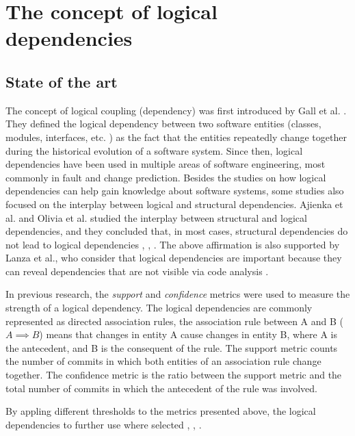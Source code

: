 \documentclass[runningheads]{comsis2}
\begin{document}
\section{The concept of logical dependencies}

\subsection{State of the art}

The concept of logical coupling (dependency) was first introduced by Gall et al. \cite{Gall:1998:DLC:850947.853338}. They defined the logical dependency between two software entities (classes, modules, interfaces, etc. ) as the fact that the entities repeatedly change together during the historical evolution of a software system.
Since then, logical dependencies have been used in multiple areas of software engineering, most commonly in fault and change prediction.  
Besides the studies on how logical dependencies can help gain knowledge about software systems, some studies also focused on the interplay between logical and structural dependencies. Ajienka et al. and Olivia et al. studied the interplay between structural and logical dependencies, and they concluded that, in most cases, structural dependencies do not lead to logical dependencies \cite{Oliva:2011:ISL:2067853.2068086}, \cite{DBLP:conf/issre/OlivaG15}, \cite{DBLP:journals/jss/AjienkaC17}. The above affirmation is also supported by Lanza et al., who consider that logical dependencies are important because they can reveal dependencies that are not visible via code analysis \cite{inproceedings_radar_evolution}.



In previous research, the \textit{support} and \textit{confidence} metrics were used to measure the strength of a logical dependency. 
The logical dependencies are commonly represented as directed association rules, the association rule between A and B ( $A \implies B$) means that changes in entity A cause changes in entity B, where A is the antecedent, and B is the consequent of the rule. 
The support metric counts the number of commits in which both entities of an association rule change together. The confidence metric is the ratio between the support metric and the total number of commits in which the antecedent of the rule was involved. 

By appling different thresholds to the metrics presented above, the logical dependencies to further use where selected \cite{DBLP:conf/issre/OlivaG15}, \cite{DBLP:journals/jss/AjienkaC17}, \cite{Zimmermann:2004:MVH:998675.999460}.
\end{document}
